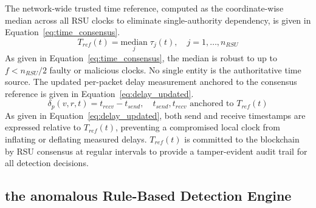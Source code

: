 \documentclass[12pt, a4paper]{report}
\begin{document}
The network-wide trusted time reference, computed as the
coordinate-wise median across all \ac{RSU} clocks to
eliminate single-authority dependency, is given in
Equation~\eqref{eq:time_consensus}.
\begin{equation}
T_{ref}(t)=\underset{j}{\text{median}}\;\tau_j(t),
\quad j=1,\ldots,n_{RSU}
\label{eq:time_consensus}
\end{equation}
As given in Equation~\eqref{eq:time_consensus}, the
median is robust to up to $f{<}n_{RSU}/2$ faulty or
malicious clocks. No single entity is the authoritative
time source.
The updated per-packet delay measurement anchored to
the consensus reference is given in
Equation~\eqref{eq:delay_updated}.
\begin{equation}
\delta_p(v,r,t)=t_{recv}-t_{send},\quad
t_{send},t_{recv}\text{ anchored to }T_{ref}(t)
\label{eq:delay_updated}
\end{equation}
As given in Equation~\eqref{eq:delay_updated}, both
send and receive timestamps are expressed relative to
$T_{ref}(t)$, preventing a compromised local clock from
inflating or deflating measured delays. $T_{ref}(t)$ is
committed to the blockchain by \ac{RSU} consensus at
regular intervals to provide a tamper-evident audit
trail for all detection decisions.

\subsection{the anomalous Rule-Based Detection Engine}
\label{sec:rule_based}
\end{document}
